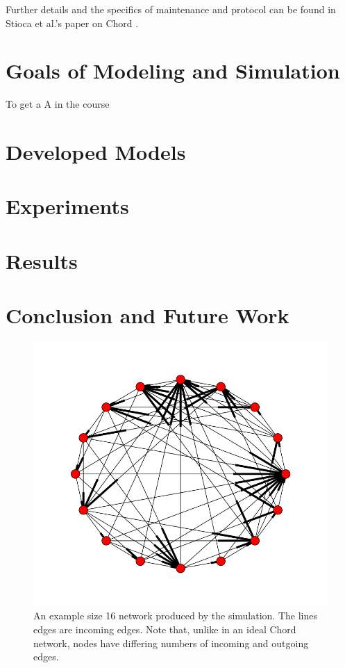 \documentclass[10pt, conference, compsocconf, letterpaper]{IEEEtran} %
\begin{document}
Further details and the specifics of maintenance and protocol can be found in Stioca et al.'s paper on Chord \cite{Chord}.


\section{Goals of Modeling and Simulation}
To get a A in the course

\section{Developed Models}


\section{Experiments}

\section{Results}

\section{Conclusion and Future Work}



\begin{figure}
\includegraphics[width=\linewidth]{chordreal}
\caption{An example size 16 network produced by the simulation.  The lines edges are incoming edges.  Note that, unlike in an ideal Chord network, nodes have differing numbers of incoming and outgoing edges.}
\label{chordreal}
\end{figure}








\end{document}
